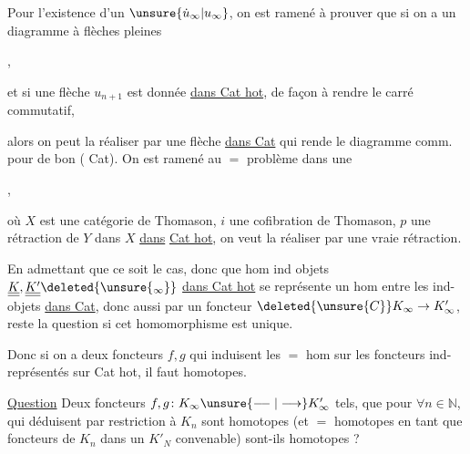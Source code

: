 Pour l'existence d'un $\unsure{\dot u_\infty|u_\infty}$, on est ramené à prouver que si on a un diagramme à flèches pleines

,

et si une flèche $u_{n+1}$ est donnée  \uline{dans Cat hot}, de façon à rendre le carré commutatif,


alors on peut la réaliser par une flèche \uline{dans Cat} qui rende le diagramme comm. pour de bon ( Cat). On est ramené au $=$ problème dans une 

,

où $X$ est une catégorie de Thomason, $i$ une cofibration de Thomason, $p$ une rétraction de $Y$ dans $X$ \uline{dans} \uline{Cat hot}, on veut la réaliser par une vraie rétraction.


En admettant que ce soit le cas, donc que  hom  ind objets $\underline{\underline K},\underline{\underline {K'}}\deleted{\unsure{{}_{\infty}}}$ \uline{dans Cat hot} se représente  un hom  entre les ind-objets \uline{dans Cat}, donc aussi par un foncteur $\deleted{\unsure{C}}K_\infty\to K'_\infty$, reste la question si cet homomorphisme  est unique. 

Donc si on a deux  foncteurs $f,g$ qui induisent les $=$ hom sur les foncteurs ind-représentés  sur Cat hot, il faut   homotopes.  


\uline{Question} Deux foncteurs $f,g\colon K_\infty\unsure{\relbar\joinrel\relbar|\longrightarrow} K'_\infty$  tels, que pour $\forall n\in\mathbb N$,  qui  déduisent par restriction à $K_n$ sont homotopes  (et $=$ homotopes en tant que foncteurs de $K_n$ dans un $K'_N$ convenable)  sont-ils homotopes ?

